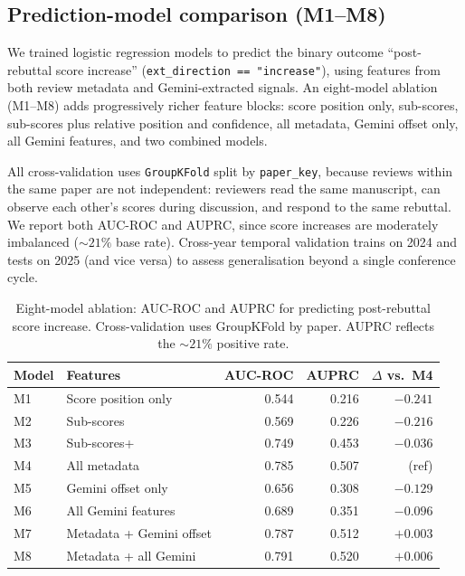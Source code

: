 \documentclass{article}
\newcommand{\code}[1]{\texttt{#1}}
\begin{document}
\subsection{Prediction-model comparison (M1--M8)}\label{app:prediction-comparison}

We trained logistic regression models to predict the binary outcome ``post-rebuttal score increase'' (\code{ext\_direction == "increase"}), using features from both review metadata and Gemini-extracted signals. An eight-model ablation (M1--M8) adds progressively richer feature blocks: score position only, sub-scores, sub-scores plus relative position and confidence, all metadata, Gemini offset only, all Gemini features, and two combined models.

All cross-validation uses \texttt{GroupKFold} split by \code{paper\_key}, because reviews within the same paper are not independent: reviewers read the same manuscript, can observe each other's scores during discussion, and respond to the same rebuttal. We report both AUC-ROC and AUPRC, since score increases are moderately imbalanced (${\sim}21\%$ base rate). Cross-year temporal validation trains on 2024 and tests on 2025 (and vice versa) to assess generalisation beyond a single conference cycle.

\begin{table}[htbp]
  \centering
  \caption{Eight-model ablation: AUC-ROC and AUPRC for predicting post-rebuttal score increase. Cross-validation uses GroupKFold by paper. AUPRC reflects the ${\sim}21\%$ positive rate.}
  \label{tab:ablation}
  \small
  \begin{tabular}{llrrr}
    \toprule
    Model & Features & AUC-ROC & AUPRC & $\Delta$ vs.\ M4 \\
    \midrule
    M1 & Score position only        & 0.544 & 0.216 & $-0.241$ \\
    M2 & Sub-scores                 & 0.569 & 0.226 & $-0.216$ \\
    M3 & Sub-scores+                & 0.749 & 0.453 & $-0.036$ \\
    M4 & All metadata               & 0.785 & 0.507 & (ref) \\
    M5 & Gemini offset only         & 0.656 & 0.308 & $-0.129$ \\
    M6 & All Gemini features        & 0.689 & 0.351 & $-0.096$ \\
    M7 & Metadata + Gemini offset   & 0.787 & 0.512 & $+0.003$ \\
    M8 & Metadata + all Gemini      & 0.791 & 0.520 & $+0.006$ \\
    \bottomrule
  \end{tabular}
\end{table}
\end{document}
